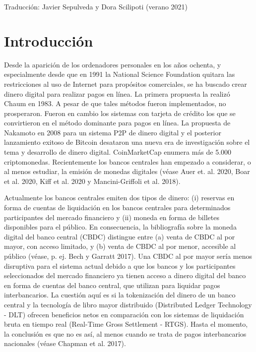 \documentclass[10pt,spanish]{article}
\begin{document}
Traducción: Javier Sepulveda y Dora Scilipoti (verano 2021)


\newpage
\hypertarget{introducciuxf3n}{%
\section{Introducción}
\label{1.-introducciuxf3n}}

Desde la aparición de los ordenadores personales en los años ochenta, y
especialmente desde que en 1991 la National Science Foundation quitara
las restricciones al uso de Internet para propósitos comerciales, se ha
buscado crear dinero digital para realizar pagos en línea. La primera
propuesta la realizó Chaum en 1983. A pesar de que tales métodos fueron
implementados, no prosperaron. Fueron en cambio los sistemas con tarjeta
de crédito los que se convirtieron en el método dominante para pagos en
línea. La propuesta de Nakamoto en 2008 para un sistema P2P de dinero
digital y el posterior lanzamiento exitoso de Bitcoin desataron una
nueva era de investigación sobre el tema y desarrollo de dinero digital.
CoinMarketCap enumera más de 5.000 criptomonedas. Recientemente los
bancos centrales han empezado a considerar, o al menos estudiar, la
emisión de monedas digitales (véase Auer et. al. 2020, Boar et al. 2020,
Kiff et al. 2020 y Mancini-Griffoli et al. 2018).

Actualmente los bancos centrales emiten dos tipos de dinero: (i)
reservas en forma de cuentas de liquidación en los bancos centrales para
determinados participantes del mercado financiero y (ii) moneda en forma
de billetes disponibles para el público. En consecuencia, la
bibliografía sobre la moneda digital del banco central (CBDC) distingue
entre (a) venta de CBDC al por mayor, con acceso limitado, y (b) venta
de CBDC al por menor, accesible al público (véase, p. ej. Bech y Garratt
2017). Una CBDC al por mayor sería menos disruptiva para el sistema
actual debido a que los bancos y los participantes seleccionados del
mercado financiero ya tienen acceso a dinero digital del banco en forma
de cuentas del banco central, que utilizan para liquidar pagos
interbancarios. La cuestión aquí es si la tokenización del dinero de un
banco central y la tecnología de libro mayor distribuido (Distributed
Ledger Technology - DLT) ofrecen beneficios netos en comparación con los
sistemas de liquidación bruta en tiempo real (Real-Time Gross
Settlement - RTGS). Hasta el momento, la conclusión es que no es así, al
menos cuando se trata de pagos interbancarios nacionales (véase Chapman
et al. 2017).
\end{document}
